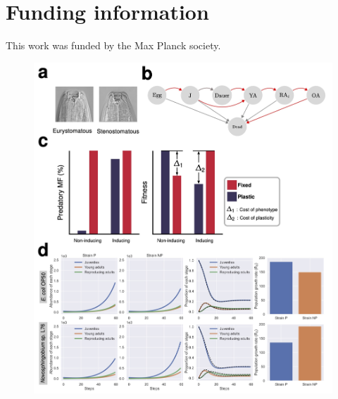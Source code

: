 \documentclass[10pt,letterpaper]{article}
\begin{document}
\section*{Funding information}
This work was funded by the Max Planck society. 



\newpage

\begin{figure}
\begin{adjustwidth}{-2in}{0in}
    \begin{flushright}
\includegraphics[width=140mm]{figures/figure1.jpg}

\end{flushright}
\end{adjustwidth}
\end{figure}
\end{document}
